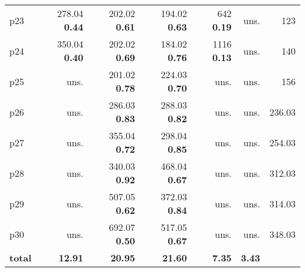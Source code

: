 \begin{tabular}{lrrrrrr}
\multicolumn{1}{l|}{p23} & {\footnotesize 278.04} \textbf{0.44} & {\footnotesize 202.02} \textbf{0.61} & {\footnotesize 194.02} \textbf{0.63} & {\footnotesize 642} \textbf{0.19} & uns. & \multicolumn{1}{|r}{123}\\
\multicolumn{1}{l|}{p24} & {\footnotesize 350.04} \textbf{0.40} & {\footnotesize 202.02} \textbf{0.69} & {\footnotesize 184.02} \textbf{0.76} & {\footnotesize 1116} \textbf{0.13} & uns. & \multicolumn{1}{|r}{140}\\
\multicolumn{1}{l|}{p25} & uns. & {\footnotesize 201.02} \textbf{0.78} & {\footnotesize 224.03} \textbf{0.70} & uns. & uns. & \multicolumn{1}{|r}{156}\\
\multicolumn{1}{l|}{p26} & uns. & {\footnotesize 286.03} \textbf{0.83} & {\footnotesize 288.03} \textbf{0.82} & uns. & uns. & \multicolumn{1}{|r}{236.03}\\
\multicolumn{1}{l|}{p27} & uns. & {\footnotesize 355.04} \textbf{0.72} & {\footnotesize 298.04} \textbf{0.85} & uns. & uns. & \multicolumn{1}{|r}{254.03}\\
\multicolumn{1}{l|}{p28} & uns. & {\footnotesize 340.03} \textbf{0.92} & {\footnotesize 468.04} \textbf{0.67} & uns. & uns. & \multicolumn{1}{|r}{312.03}\\
\multicolumn{1}{l|}{p29} & uns. & {\footnotesize 507.05} \textbf{0.62} & {\footnotesize 372.03} \textbf{0.84} & uns. & uns. & \multicolumn{1}{|r}{314.03}\\
\multicolumn{1}{l|}{p30} & uns. & {\footnotesize 692.07} \textbf{0.50} & {\footnotesize 517.05} \textbf{0.67} & uns. & uns. & \multicolumn{1}{|r}{348.03}\\
\midrule
\textbf{total} & \textbf{12.91} & \textbf{20.95} & \textbf{21.60} & \textbf{7.35} & \textbf{3.43} & \\
\bottomrule
\end{tabular}

